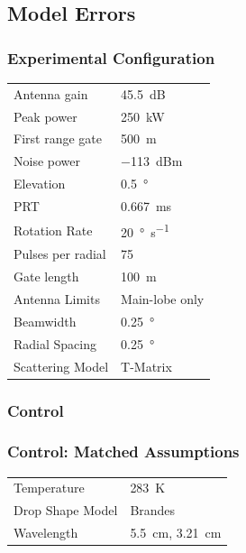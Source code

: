 \documentclass[red]{beamer}
\begin{document}
\subsection{Model Errors}
\begin{frame}
	\frametitle{Experimental Configuration}
	\begin{center}
	    \begin{tabular}{ | l | l | }
	        \hline
	        Antenna gain & \SI{45.5}{dB} \\
	        Peak power & \SI{250}{\kilo\watt} \\
	        First range gate & \SI{500}{\meter} \\
	        Noise power & \SI{-113}{dBm} \\
	        Elevation & \SI{0.5}{\degree} \\
	        PRT & \SI{0.667}{\milli\second} \\
	        Rotation Rate & \SI{20}{\degree\per\second} \\
	        Pulses per radial & \num{75} \\
	        Gate length & \SI{100}{\meter} \\
	        Antenna Limits & Main-lobe only \\
			Beamwidth & \SI{0.25}{\degree} \\
			Radial Spacing & \SI{0.25}{\degree} \\
			Scattering Model & T-Matrix \\
			\hline
	    \end{tabular}
	\end{center}
\end{frame}

\subsubsection{Control}
\begin{frame}
	\frametitle{Control: Matched Assumptions}
	\begin{center}
	    \begin{tabular}{ | l | l | }
	        \hline
	        Temperature & \SI{283}{\kelvin} \\
	        Drop Shape Model & Brandes \\
	        Wavelength & \SI{5.5}{\centi\meter}, \SI{3.21}{\centi\meter} \\
			\hline
	    \end{tabular}
	\end{center}	
\end{frame}
\end{document}
